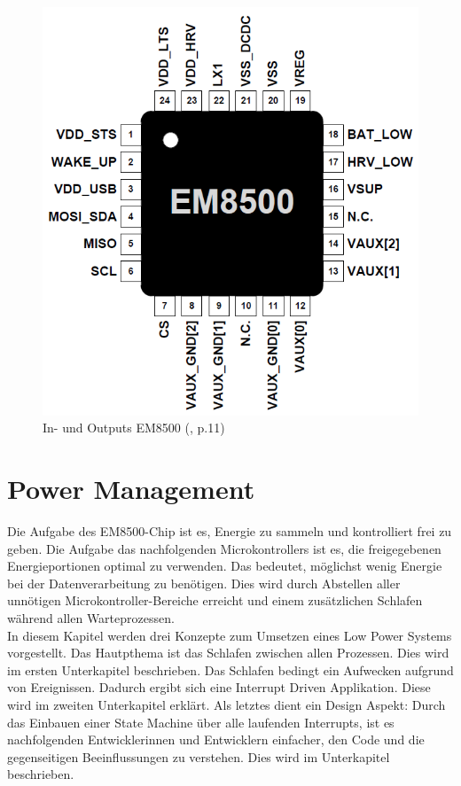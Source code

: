 {\begin{figure}    
    \includegraphics{2TheoretischeGrundlagen/imag/EM8500IO.png}
    \caption{In- und Outputs EM8500  (\cite{datasheet_EM85}, p.11)}\label{IOEM8500} 
\end{figure}



\section{Power Management}\label{t_power_management} 
Die Aufgabe des EM8500-Chip ist es, Energie zu sammeln und kontrolliert frei zu geben. Die Aufgabe das nachfolgenden Microkontrollers ist es, die freigegebenen Energieportionen optimal zu verwenden. Das bedeutet, möglichst wenig Energie bei der Datenverarbeitung zu benötigen. Dies wird durch Abstellen aller unnötigen Microkontroller-Bereiche erreicht und einem zusätzlichen Schlafen während allen Warteprozessen.\\

In diesem Kapitel werden drei Konzepte zum Umsetzen eines Low Power Systems vorgestellt. Das Hautpthema ist das Schlafen zwischen allen Prozessen. Dies wird im ersten Unterkapitel beschrieben. Das Schlafen bedingt ein Aufwecken aufgrund von Ereignissen. Dadurch ergibt sich eine Interrupt Driven Applikation. Diese wird im zweiten Unterkapitel erklärt. Als letztes dient ein Design Aspekt: Durch das Einbauen einer State Machine über alle laufenden Interrupts, ist es nachfolgenden Entwicklerinnen und Entwicklern einfacher, den Code und die gegenseitigen Beeinflussungen zu verstehen. Dies wird im Unterkapitel beschrieben.\\

}
